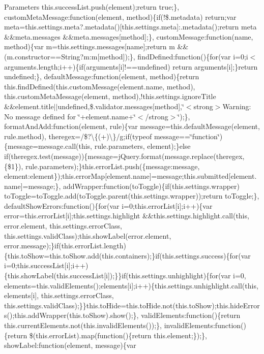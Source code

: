\begin{DoxyParams}{Parameters}
this.\+success\+List.\+push(element);return true;\}, custom\+Meta\+Message\+:function(element, method)\{if(!\$.metadata) return;var meta=this.\+settings.\+meta?.metadata()\mbox{[}this.\+settings.\+meta\mbox{]}\+:.metadata();return meta \&\&meta.\+messages \&\&meta.\+messages\mbox{[}method\mbox{]};\}, custom\+Message\+:function(name, method)\{var m=this.\+settings.\+messages\mbox{[}name\mbox{]};return m \&\&(m.\+constructor==String?m\+:m\mbox{[}method\mbox{]});\}, find\+Defined\+:function()\{for(var i=0;i$<$ arguments.\+length;i++)\{if(arguments\mbox{[}i\mbox{]}!==undefined) return arguments\mbox{[}i\mbox{]};\}return undefined;\}, default\+Message\+:function(element, method)\{return this.\+find\+Defined(this.\+custom\+Message(element.\+name, method), this.\+custom\+Meta\+Message(element, method),!this.settings.\+ignore\+Title \&\&element.\+title$\vert$$\vert$undefined,\$.validator.\+messages\mbox{[}method\mbox{]},\char`\"{}$<$strong$>$\+Warning\+: No message defined for \char`\"{}+element.name+\char`\"{}$<$/strong$>$\char`\"{});\}, format\+And\+Add\+:function(element, rule)\{var message=this.\+default\+Message(element, rule.\+method), theregex=/\$?\textbackslash{}\{(+)\textbackslash{}\}/g;if(typeof message==\char`\"{}function\char`\"{})\{message=message.\+call(this, rule.\+parameters, element);\}else if(theregex.\+test(message))\{message=j\+Query.\+format(message.\+replace(theregex, \textquotesingle{}\{\$1\}\textquotesingle{}), rule.\+parameters);\}this.\+error\+List.\+push(\{message\+:message, element\+:element\});this.\+error\+Map\mbox{[}element.\+name\mbox{]}=message;this.\+submitted\mbox{[}element.\+name\mbox{]}=message;\}, add\+Wrapper\+:function(to\+Toggle)\{if(this.\+settings.\+wrapper) to\+Toggle=to\+Toggle.\+add(to\+Toggle.\+parent(this.\+settings.\+wrapper));return to\+Toggle;\}, default\+Show\+Errors\+:function()\{for(var i=0;this.\+error\+List\mbox{[}i\mbox{]};i++)\{var error=this.\+error\+List\mbox{[}i\mbox{]};this.\+settings.\+highlight \&\&this.\+settings.\+highlight.\+call(this, error.\+element, this.\+settings.\+error\+Class, this.\+settings.\+valid\+Class);this.\+show\+Label(error.\+element, error.\+message);\}if(this.\+error\+List.\+length)\{this.\+to\+Show=this.\+to\+Show.\+add(this.\+containers);\}if(this.\+settings.\+success)\{for(var i=0;this.\+success\+List\mbox{[}i\mbox{]};i++)\{this.\+show\+Label(this.\+success\+List\mbox{[}i\mbox{]});\}\}if(this.\+settings.\+unhighlight)\{for(var i=0, elements=this.\+valid\+Elements();elements\mbox{[}i\mbox{]};i++)\{this.\+settings.\+unhighlight.\+call(this, elements\mbox{[}i\mbox{]}, this.\+settings.\+error\+Class, this.\+settings.\+valid\+Class);\}\}this.\+to\+Hide=this.\+to\+Hide.\+not(this.\+to\+Show);this.\+hide\+Errors();this.\+add\+Wrapper(this.\+to\+Show).show();\}, valid\+Elements\+:function()\{return this.\+current\+Elements.\+not(this.\+invalid\+Elements());\}, invalid\+Elements\+:function()\{return \$(this.\+error\+List).map(function()\{return this.\+element;\});\}, show\+Label\+:function(element, message)\{var 
\end{DoxyParams}
